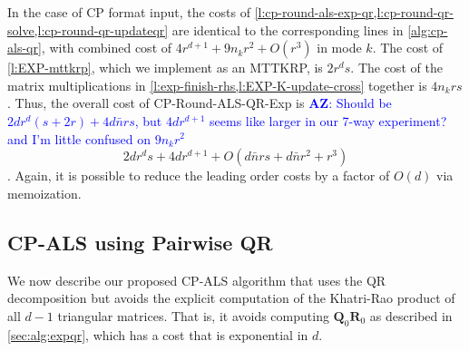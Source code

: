 \documentclass{article}
\newcommand{\mat}[1]{\mathbf{#1}}
\newcommand{\AZ}[1]{\textcolor{blue}{\textbf{AZ}: #1}}
\begin{document}
\begin{algorithm}[!ht]
  \caption{CP-Round-ALS-QR-Exp}
  \label{alg:cp-als-qr-k}
  
\end{algorithm}

In the case of CP format input, the costs of \cref{l:cp-round-als-exp-qr,l:cp-round-qr-solve,l:cp-round-qr-updateqr} are identical to the corresponding lines in \cref{alg:cp-als-qr}, with combined cost of $4r^{d+1}+9n_kr^2+O(r^3)$ in mode $k$.
The cost of \cref{l:EXP-mttkrp}, which we implement as an MTTKRP, is $2r^ds$.
The cost of the matrix multiplications in \cref{l:exp-finish-rhs,l:EXP-K-update-cross} together is $4n_krs$.
Thus, the overall cost of CP-Round-ALS-QR-Exp is \AZ{Should be $2dr^d(s+2r) + 4d\bar n rs$, but $4dr^{d+1}$ seems like larger in our 7-way experiment? and I'm little confused on $9n_kr^2$}
$$ 2dr^ds + 4dr^{d+1} + O(d\bar{n}rs+d\bar{n}r^2 + r^3) $$. 
Again, it is possible to reduce the leading order costs by a factor of $O(d)$ via memoization.

\subsection{CP-ALS using Pairwise QR}
\label{sec:alg:pwqr}


We now describe our proposed CP-ALS algorithm that uses the QR decomposition but avoids the explicit computation of the Khatri-Rao product of all $d-1$ triangular matrices.
That is, it avoids computing $\mat{Q}_0\mat{R}_0$ as described in \cref{sec:alg:expqr}, which has a cost that is exponential in $d$.
\end{document}
